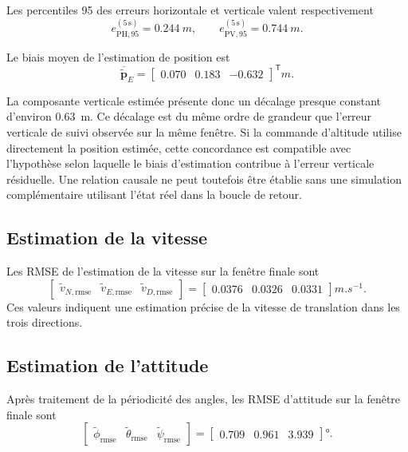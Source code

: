 \documentclass[11pt,a4paper,oneside]{report}
\newcommand{\vect}[1]{\bm{#1}}
\newcommand{\trans}{^{\mathsf T}}
\begin{document}
Les percentiles 95 des erreurs horizontale et verticale valent respectivement
\begin{equation}
	e_{\mathrm{PH},95}^{(5\,\mathrm{s})}
	=
	\SI{0.244}{m},
	\qquad
	e_{\mathrm{PV},95}^{(5\,\mathrm{s})}
	=
	\SI{0.744}{m}.
	\label{eq_results_ekf_position_p95}
\end{equation}

Le biais moyen de l'estimation de position est
\begin{equation}
	\overline{\tilde{\vect p}}_E
	=
	\begin{bmatrix}
		0.070 &
		0.183 &
		-0.632
	\end{bmatrix}\trans
	\si{m}.
	\label{eq_results_ekf_position_bias}
\end{equation}

La composante verticale estimée présente donc un décalage presque constant d'environ \SI{0.63}{m}. Ce décalage est du même ordre de grandeur que l'erreur verticale de suivi observée sur la même fenêtre. Si la commande d'altitude utilise directement la position estimée, cette concordance est compatible avec l'hypothèse selon laquelle le biais d'estimation contribue à l'erreur verticale résiduelle. Une relation causale ne peut toutefois être établie sans une simulation complémentaire utilisant l'état réel dans la boucle de retour.

\subsection{Estimation de la vitesse}

Les RMSE de l'estimation de la vitesse sur la fenêtre finale sont
\begin{equation}
	\begin{bmatrix}
		\tilde v_{N,\mathrm{rmse}} &
		\tilde v_{E,\mathrm{rmse}} &
		\tilde v_{D,\mathrm{rmse}}
	\end{bmatrix}
	=
	\begin{bmatrix}
		0.0376 &
		0.0326 &
		0.0331
	\end{bmatrix}
	\si{m.s^{-1}}.
	\label{eq_results_ekf_velocity_rmse}
\end{equation}
Ces valeurs indiquent une estimation précise de la vitesse de translation dans les trois directions.

\subsection{Estimation de l'attitude}

Après traitement de la périodicité des angles, les RMSE d'attitude sur la fenêtre finale sont
\begin{equation}
	\begin{bmatrix}
		\tilde\phi_{\mathrm{rmse}} &
		\tilde\theta_{\mathrm{rmse}} &
		\tilde\psi_{\mathrm{rmse}}
	\end{bmatrix}
	=
	\begin{bmatrix}
		0.709 &
		0.961 &
		3.939
	\end{bmatrix}
	\si{\degree}.
	\label{eq_results_ekf_attitude_rmse}
\end{equation}
\end{document}
